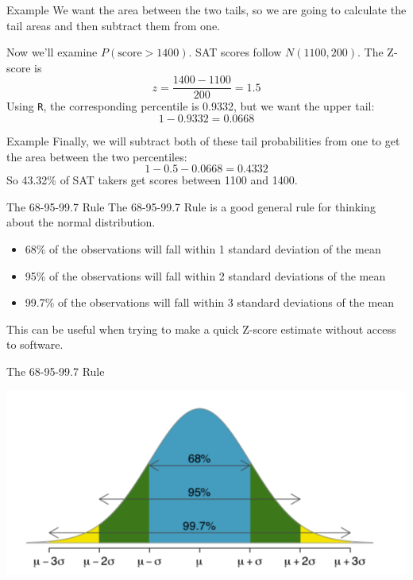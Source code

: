 \begin{frame}{Example}
    We want the area between the two tails, so we are going to calculate the tail areas and then subtract them from one.
    
    \vspace{12pt}Now we'll examine $P(\text{score}>1400)$. SAT scores follow $N(1100,200)$. The Z-score is
    \[
        z = \frac{1400-1100}{200} = 1.5
    \]
    Using \texttt{R}, the corresponding percentile is 0.9332, but we want the upper tail:
    \[
        1-0.9332=0.0668
    \]
\end{frame}

\begin{frame}{Example}
    Finally, we will subtract both of these tail probabilities from one to get the area between the two percentiles:
    \[
    1-0.5-0.0668=0.4332
    \]
    So 43.32\% of SAT takers get scores between 1100 and 1400.
\end{frame}

\begin{frame}{The 68-95-99.7 Rule}
    The 68-95-99.7 Rule is a good general rule for thinking about the normal distribution.
    
    \begin{itemize}
        \item 68\% of the observations will fall within 1 standard deviation of the mean
        \item 95\% of the observations will fall within 2 standard deviations of the mean
        \item 99.7\% of the observations will fall within 3 standard deviations of the mean
    \end{itemize}
    This can be useful when trying to make a quick Z-score estimate without access to software.
\end{frame}

\begin{frame}{The 68-95-99.7 Rule}
    \begin{center}
        \includegraphics[scale=0.5]{images/rule68_95_997.png}
    \end{center}
\end{frame}

